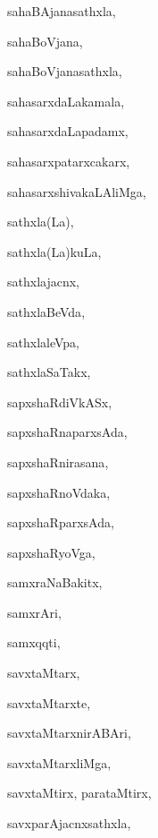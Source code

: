 \begin{multicols}{3}
{\noindent
{sahaBAjanasathxla}, \pageref{sahaBAjanasathxla}

\noindent
{sahaBoVjana}, \pageref{sahaBoVjana}

\noindent
{sahaBoVjanasathxla}, \pageref{sahaBoVjanasathxla}

\noindent
{sahasarxdaLakamala}, \pageref{sahasarxdaLakamala}

\noindent
{sahasarxdaLapadamx}, \pageref{sahasarxdaLapadamx}

\noindent
{sahasarxpatarxcakarx}, \pageref{sahasarxpatarxcakarx}

\noindent
{sahasarxshivakaLAliMga}, \pageref{sahasarxshivakaLAliMga}

\noindent
{sathxla(La)}, \pageref{sathxlaLa}

\noindent
{sathxla(La)kuLa}, \pageref{sathxlaLakuLa}

\noindent
{sathxlajacnx}, \pageref{sathxlajacnx}

\noindent
{sathxlaBeVda}, \pageref{sathxlaBeVda}

\noindent
{sathxlaleVpa}, \pageref{sathxlaleVpa}

\noindent
{sathxlaSaTakx}, \pageref{sathxlaSaTakx}

\noindent
{sapxshaRdiVkASx}, \pageref{sapxshaRdiVkASx}

\noindent
{sapxshaRnaparxsAda}, \pageref{sapxshaRnaparxsAda}

\noindent
{sapxshaRnirasana}, \pageref{sapxshaRnirasana}

\noindent
{sapxshaRnoVdaka}, \pageref{sapxshaRnoVdaka}

\noindent
{sapxshaRparxsAda}, \pageref{sapxshaRparxsAda}

\noindent
{sapxshaRyoVga}, \pageref{sapxshaRyoVga}

\noindent
{samxraNaBakitx}, \pageref{samxraNaBakitx}

\noindent
{samxrAri}, \pageref{samxrAri}

\noindent
{samxqqti}, \pageref{samxqqti}

\noindent
{savxtaMtarx}, \pageref{savxtaMtarx}

\noindent
{savxtaMtarxte}, \pageref{savxtaMtarxte}

\noindent
{savxtaMtarxnirABAri}, \pageref{savxtaMtarxnirABAri}

\noindent
{savxtaMtarxliMga}, \pageref{savxtaMtarxliMga}

\noindent
{savxtaMtirx, parataMtirx}, \pageref{savxtaMtirx, parataMtirx}

\noindent
{savxparAjacnxsathxla}, \pageref{savxparAjacnxsathxla}

}
\end{multicols}
